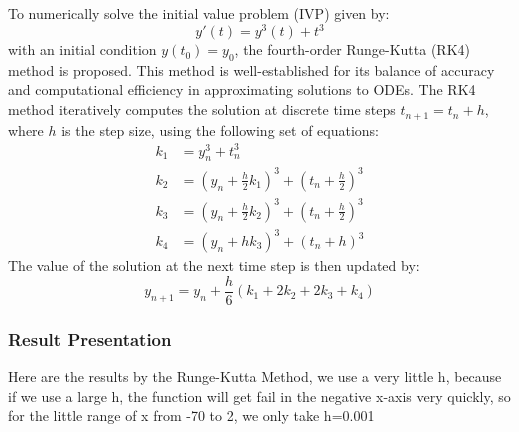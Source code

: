 \documentclass{article}
\begin{document}
To numerically solve the initial value problem (IVP) given by:
$$y'(t) = y^3(t) + t^3$$
with an initial condition $y(t_0) = y_0$, the fourth-order Runge-Kutta (RK4) method is proposed. This method is well-established for its balance of accuracy and computational efficiency in approximating solutions to ODEs. The RK4 method iteratively computes the solution at discrete time steps $t_{n+1} = t_n + h$, where $h$ is the step size, using the following set of equations:
\begin{align*}
    k_1 &= y_n^3 + t_n^3 \\
    k_2 &= \left(y_n + \frac{h}{2}k_1\right)^3 + \left(t_n + \frac{h}{2}\right)^3 \\
    k_3 &= \left(y_n + \frac{h}{2}k_2\right)^3 + \left(t_n + \frac{h}{2}\right)^3 \\
    k_4 &= (y_n + hk_3)^3 + (t_n + h)^3
\end{align*}
The value of the solution at the next time step is then updated by:
$$y_{n+1} = y_n + \frac{h}{6}(k_1 + 2k_2 + 2k_3 + k_4)$$




\subsubsection{Result Presentation}




Here are the results by the Runge-Kutta Method, we use a very little h, because if we use a large h, the function will get fail in the negative x-axis very quickly, so for the little range of x from -70 to 2, we only take  h=0.001
\end{document}
